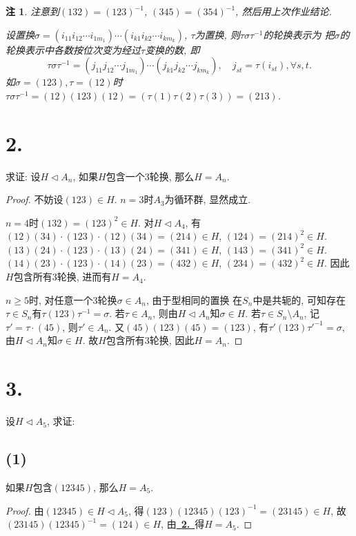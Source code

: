 \documentclass[12pt, a4paper, fontset=windows]{ctexart}
\newcommand{\myref}[2][]{\hyperref[#1]{\color{blue}\ {#2}\ }}
\newtheorem*{remark}{注}
\begin{document}
\begin{remark}
注意到$(132)=(123)^{-1}$, $(345)=(354)^{-1}$, 然后用上次作业结论. 

设置换$\sigma=(i_{11}i_{12}\cdots 
i_{1m_1})\cdots(i_{k1}i_{k2}\cdots i_{km_k})$, 
$\tau$为置换, 则$\tau\sigma\tau^{-1}$的轮换表示为
把$\sigma$的轮换表示中各数按位次变为经过$\tau$变换的数, 即
\[\tau\sigma\tau^{-1}=(j_{11}j_{12}\cdots j_{1m_1})\cdots(j_{k1}j_{k2}\cdots j_{km_k}),
\quad j_{st}=\tau(i_{st}),\forall s,t.\]
如$\sigma=(123),\tau=(12)$时$\tau\sigma\tau^{-1}=
(12)(123)(12)=(\tau(1)\tau(2)\tau(3))=(213)$. 
\end{remark}

\section*{2.}
\label{tri-An}

求证: 设$H\lhd A_n$, 如果$H$包含一个3轮换, 那么$H=A_n$. 

\begin{proof}
不妨设$(123)\in H$. $n=3$时$A_3$为循环群, 显然成立. 

$n=4$时$(132)=(123)^2\in H$. 对$H\lhd A_4$, 有
$(12)(34)\cdot(123)\cdot(12)(34)=(214)\in H$, $(124)=(214)^2\in H$. 
$(13)(24)\cdot(123)\cdot(13)(24)=(341)\in H$, $(143)=(341)^2\in H$. 
$(14)(23)\cdot(123)\cdot(14)(23)=(432)\in H$, $(234)=(432)^2\in H$. 
因此$H$包含所有3轮换, 进而有$H=A_4$. 

$n\ge 5$时, 对任意一个3轮换$\sigma\in A_n$, 由于型相同的置换
在$S_n$中是共轭的, 可知存在$\tau\in S_n$有$\tau(123)\tau^{-1}=\sigma$. 
若$\tau\in A_n$, 则由$H\lhd A_n$知$\sigma\in H$. 
若$\tau\in S_n\setminus A_n$, 
记$\tau'=\tau\cdot(45)$, 则$\tau'\in A_n$. 
又$(45)(123)(45)=(123)$, 有$\tau'(123)\tau'^{-1}=\sigma$, 
由$H\lhd A_n$知$\sigma\in H$. 故$H$包含所有3轮换, 因此$H=A_n$. 
\end{proof}

\section*{3.}

设$H\lhd A_5$, 求证: 

\subsection*{(1)}

如果$H$包含$(12345)$, 那么$H=A_5$. 

\begin{proof}
由$(12345)\in H\lhd A_5$, 得$(123)(12345)(123)^{-1}=(23145)\in H$, 
故$(23145)(12345)^{-1}=(124)\in H$, 由\myref[tri-An]{\bf 2.}得$H=A_5$. 
\end{proof}
\end{document}
